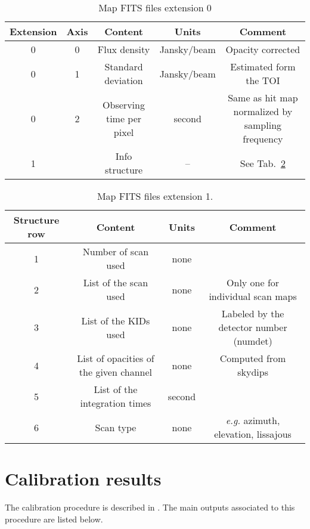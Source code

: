 \documentclass[a4paper,10pt]{article}
\begin{document}
	\begin{table}[ht]
	\begin{center}
	\begin{tabular}{|c|c|c|c|c|}
         \hline
	Extension & Axis & Content & Units & Comment \\
	\hline
	0 & 0 & Flux density & Jansky/beam & Opacity corrected \\
	0 & 1 & Standard deviation & Jansky/beam & Estimated form the TOI \\
	0 & 2 & Observing time per pixel & second & Same as hit map normalized by sampling frequency \\
	1 &    & Info structure & -- & See Tab.~\ref{tab:info_map} \\
	\hline
	\end{tabular}
	\end{center}
	\caption{Map FITS files extension 0 }
	\label{tab:table_map}
	\end{table}

	\begin{table}[ht]
	\begin{center}
	\begin{tabular}{|c|c|c|c|}
         \hline
	Structure row & Content & Units & Comment \\
	\hline
        1 & Number of scan used & none & \\
        2 & List of the scan used & none & Only one for individual scan maps \\
        3 & List of the KIDs used & none & Labeled by the detector number (numdet) \\
        4 & List of opacities of the given channel & none & Computed from skydips \\
        5 & List of the integration times & second & \\
        6 & Scan type & none & {\it e.g.} azimuth, elevation, lissajous \\
	\hline
	\end{tabular}
	\end{center}
	\caption{Map FITS files extension 1.}
	\label{tab:info_map}
	\end{table}
	
\section{Calibration results}
The calibration procedure is described in \cite{NIKA_abs_calib}. The main outputs associated to this procedure are listed below.
\end{document}
